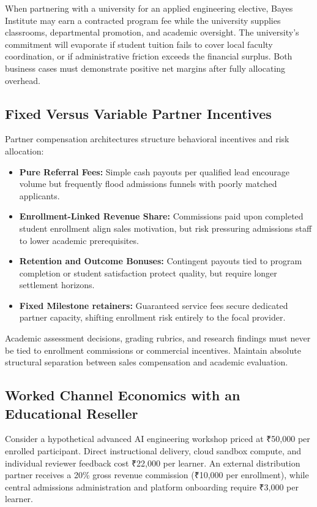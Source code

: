 When partnering with a university for an applied engineering elective, Bayes Institute may earn a contracted program fee while the university supplies classrooms, departmental promotion, and academic oversight. The university's commitment will evaporate if student tuition fails to cover local faculty coordination, or if administrative friction exceeds the financial surplus. Both business cases must demonstrate positive net margins after fully allocating overhead.

\subsection{Fixed Versus Variable Partner Incentives}
\label{sec:fixed_versus_variable_incentives}

Partner compensation architectures structure behavioral incentives and risk allocation:
\begin{itemize}
\item \textbf{Pure Referral Fees:} Simple cash payouts per qualified lead encourage volume but frequently flood admissions funnels with poorly matched applicants.
\item \textbf{Enrollment-Linked Revenue Share:} Commissions paid upon completed student enrollment align sales motivation, but risk pressuring admissions staff to lower academic prerequisites.
\item \textbf{Retention and Outcome Bonuses:} Contingent payouts tied to program completion or student satisfaction protect quality, but require longer settlement horizons.
\item \textbf{Fixed Milestone retainers:} Guaranteed service fees secure dedicated partner capacity, shifting enrollment risk entirely to the focal provider.
\end{itemize}

Academic assessment decisions, grading rubrics, and research findings must never be tied to enrollment commissions or commercial incentives. Maintain absolute structural separation between sales compensation and academic evaluation.

\subsection{Worked Channel Economics with an Educational Reseller}
\label{sec:worked_channel_economics_reseller}

Consider a hypothetical advanced AI engineering workshop priced at ₹50,000 per enrolled participant. Direct instructional delivery, cloud sandbox compute, and individual reviewer feedback cost ₹22,000 per learner. An external distribution partner receives a 20\% gross revenue commission (₹10,000 per enrollment), while central admissions administration and platform onboarding require ₹3,000 per learner.

